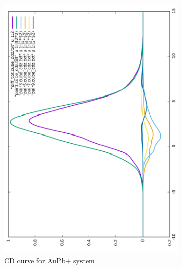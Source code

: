\documentclass[journal=inoraj,manuscript=article]{achemso}
\begin{document}
\begin{figure}[!h]
\includegraphics[angle=-90,width=0.80\textwidth]{./AuPb+/cd.pdf}
\caption{CD curve for AuPb+ system}
\end{figure}
\end{document}
